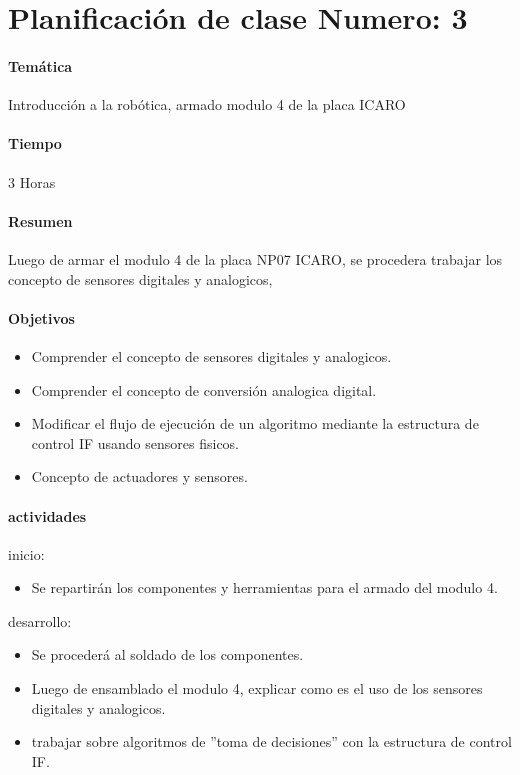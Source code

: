 \chapter*{Planificación de clase Numero: 3}
\subsubsection{Temática}
Introducción a la robótica, armado modulo 4 de la placa ICARO

\subsubsection{Tiempo}
3 Horas

\subsubsection{Resumen}

Luego de armar el modulo 4 de la placa NP07 ICARO, se procedera trabajar los concepto de sensores digitales y analogicos, 

\subsubsection{Objetivos}
\begin{itemize}
  \item Comprender el concepto de sensores digitales y analogicos.
  \item Comprender el concepto de conversión analogica digital.
  \item Modificar el flujo de ejecución de un algoritmo mediante la estructura de control IF usando sensores fisicos.
  \item Concepto de actuadores y sensores.
\end{itemize}

\subsubsection{actividades}
inicio:
\begin{itemize}
  \item Se repartirán los componentes y herramientas para el armado del modulo 4.

\end{itemize}
desarrollo:
\begin{itemize}
  \item Se procederá al soldado de los componentes. 
  \item Luego de ensamblado el modulo 4, explicar como es el uso de los sensores digitales y analogicos.
  \item trabajar sobre algoritmos de ''toma de decisiones'' con la estructura de control IF.
\end{itemize}
